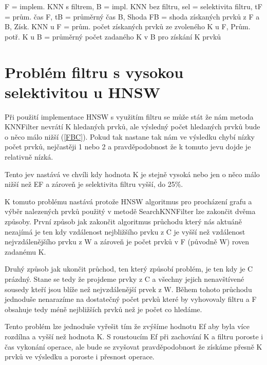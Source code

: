 \documentclass[czech,semestral,dept460,male,csharp,cpdeclaration]{diploma}
\begin{document}
\begin{center}
			{\footnotesize *F = implem. KNN s filtrem, B = impl. KNN bez filtru, sel = selektivita filtru, tF = prům. čas F, tB = průměrný čas B, Shoda FB = shoda získaných prvků z F a B, Získ. KNN u F = prům. počet získaných prvků ze zvoleného K u F, Prům. potř. K u B = průměrný počet zadaného K v B pro získání K prvků}\\
			
		
		\end{center}
		
		\section{Problém filtru s vysokou selektivitou u HNSW}
		
			Při použití implementace HNSW s využitím filtru se může stát že nám metoda KNNFilter nevrátí K hledaných prvků, ale výsledný počet hledaných prvků bude o něco málo nižší (\ref{FBC}). Pokud tak nastane tak nám ve výsledku chybí nízky počet prvků, nejčastěji 1 nebo 2 a pravděpodobnost že k tomuto jevu dojde je relativně nízká.
			
			Tento jev nastává ve chvíli kdy hodnota K je stejně vysoká nebo jen o něco málo nižší než EF a zároveň je selektivita filtru vyšší, do 25\%.
			
			K tomuto problému nastává protože HNSW algoritmus pro procházení grafu a výběr nalezených prvků použitý v metodě SearchKNNFilter lze zakončit dvěma způsoby. První způsob jak zakončit algoritmus průchodu který nás aktuáně nezajímá je ten kdy vzdálenost nejbližšího prvku z C je vyšší než vzdálenost nejvzdálenějšího prvku z W a zároveň je počet prvků v F (původně W) roven zadanému K.
			
			Druhý způsob jak ukončit průchod, ten který způsobí problém, je ten kdy je C prázdný. Stane se tedy že projdeme prvky z C a všechny jejich nenavštívené sousedy kteří jsou blíže než nejvzdálenější prvek z W. Během tohoto průchodu jednoduše nenarazíme na dostatečný počet prvků které by vyhovovaly filtru a F obsahuje tedy méně nejbližších prvků než je počet co hledáme.
			
			Tento problém lze jednoduše vyřešit tím že zvýšíme hodnotu Ef aby byla více rozdílna a vyšší než hodnota K. S roustoucím Ef při zachování K a filtru poroste i čas vykonání operace, ale bude se zvyšovat pravděpodobnost že získáme přesně K prvků ve výsledku a poroste i přesnost operace.
	
\end{document}
